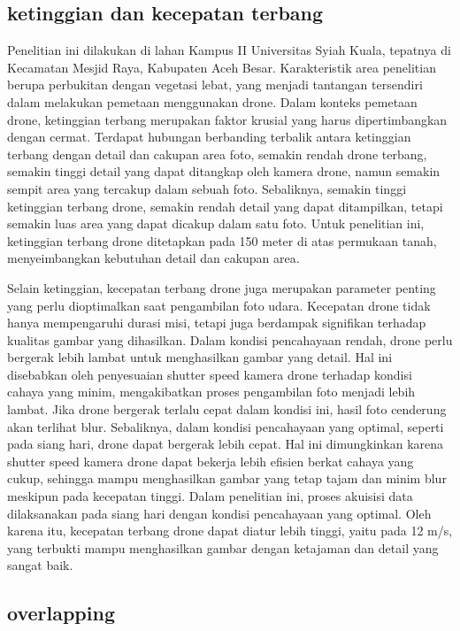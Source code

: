 \subsection{ketinggian dan kecepatan terbang}

Penelitian ini dilakukan di lahan Kampus II Universitas Syiah Kuala, tepatnya di Kecamatan Mesjid Raya, Kabupaten Aceh Besar. Karakteristik area penelitian berupa perbukitan dengan vegetasi lebat, yang menjadi tantangan tersendiri dalam melakukan pemetaan menggunakan drone. Dalam konteks pemetaan drone, ketinggian terbang merupakan faktor krusial yang harus dipertimbangkan dengan cermat. Terdapat hubungan berbanding terbalik antara ketinggian terbang dengan detail dan cakupan area foto, semakin rendah drone terbang, semakin tinggi detail yang dapat ditangkap oleh kamera drone, namun semakin sempit area yang tercakup dalam sebuah foto. Sebaliknya, semakin tinggi ketinggian terbang drone, semakin rendah detail yang dapat ditampilkan, tetapi semakin luas area yang dapat dicakup dalam satu foto. Untuk penelitian ini, ketinggian terbang drone ditetapkan pada 150 meter di atas permukaan tanah, menyeimbangkan kebutuhan detail dan cakupan area.

Selain ketinggian, kecepatan terbang drone juga merupakan parameter penting yang perlu dioptimalkan saat pengambilan foto udara. Kecepatan drone tidak hanya mempengaruhi durasi misi, tetapi juga berdampak signifikan terhadap kualitas gambar yang dihasilkan. Dalam kondisi pencahayaan rendah, drone perlu bergerak lebih lambat untuk menghasilkan gambar yang detail. Hal ini disebabkan oleh penyesuaian shutter speed kamera drone terhadap kondisi cahaya yang minim, mengakibatkan proses pengambilan foto menjadi lebih lambat. Jika drone bergerak terlalu cepat dalam kondisi ini, hasil foto cenderung akan terlihat blur. Sebaliknya, dalam kondisi pencahayaan yang optimal, seperti pada siang hari, drone dapat bergerak lebih cepat. Hal ini dimungkinkan karena shutter speed kamera drone dapat bekerja lebih efisien berkat cahaya yang cukup, sehingga mampu menghasilkan gambar yang tetap tajam dan minim blur meskipun pada kecepatan tinggi. Dalam penelitian ini, proses akuisisi data dilaksanakan pada siang hari dengan kondisi pencahayaan yang optimal. Oleh karena itu, kecepatan terbang drone dapat diatur lebih tinggi, yaitu pada 12 m/s, yang terbukti mampu menghasilkan gambar dengan ketajaman dan detail yang sangat baik.

\subsection{overlapping}

